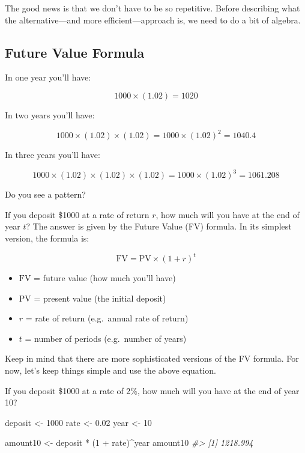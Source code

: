 \documentclass[
]{book}
\newenvironment{Shaded}{\begin{snugshade}}{\end{snugshade}}
\newcommand{\CommentTok}[1]{\textcolor[rgb]{0.56,0.35,0.01}{\textit{#1}}}
\newcommand{\DecValTok}[1]{\textcolor[rgb]{0.00,0.00,0.81}{#1}}
\newcommand{\FloatTok}[1]{\textcolor[rgb]{0.00,0.00,0.81}{#1}}
\newcommand{\NormalTok}[1]{#1}
\newcommand{\OtherTok}[1]{\textcolor[rgb]{0.56,0.35,0.01}{#1}}
\newcommand{\SpecialCharTok}[1]{\textcolor[rgb]{0.00,0.00,0.00}{#1}}
\begin{document}
The good news is that we don't have to be so repetitive. Before describing what
the alternative---and more efficient---approach is, we need to do a bit of algebra.

\hypertarget{future-value-formula}{%
\subsection{Future Value Formula}\label{future-value-formula}}

In one year you'll have:

\[
1000 \times (1.02) = 1020
\]

In two years you'll have:

\[
1000 \times (1.02) \times (1.02) = 1000 \times (1.02)^2 = 1040.4
\]

In three years you'll have:

\[
1000 \times (1.02) \times (1.02) \times (1.02) = 1000 \times (1.02)^3 = 1061.208
\]

Do you see a pattern?

If you deposit \$1000 at a rate of return \(r\), how much will you have at the
end of year \(t\)? The answer is given by the Future Value (FV) formula. In its
simplest version, the formula is:

\[
\text{FV} = \text{PV} \times (1 + r)^t
\]

\begin{itemize}
\item
  \(\text{FV}\) = future value (how much you'll have)
\item
  \(\text{PV}\) = present value (the initial deposit)
\item
  \(r\) = rate of return (e.g.~annual rate of return)
\item
  \(t\) = number of periods (e.g.~number of years)
\end{itemize}

Keep in mind that there are more sophisticated versions of the FV formula.
For now, let's keep things simple and use the above equation.

If you deposit \$1000 at a rate of 2\%, how much will you have at the end of
year 10?

\begin{Shaded}
\begin{Highlighting}[]
\NormalTok{deposit }\OtherTok{\textless{}{-}} \DecValTok{1000}
\NormalTok{rate }\OtherTok{\textless{}{-}} \FloatTok{0.02}
\NormalTok{year }\OtherTok{\textless{}{-}} \DecValTok{10}

\NormalTok{amount10 }\OtherTok{\textless{}{-}}\NormalTok{ deposit }\SpecialCharTok{*}\NormalTok{ (}\DecValTok{1} \SpecialCharTok{+}\NormalTok{ rate)}\SpecialCharTok{\^{}}\NormalTok{year}
\NormalTok{amount10}
\CommentTok{\#\textgreater{} [1] 1218.994}
\end{Highlighting}
\end{Shaded}
\end{document}
